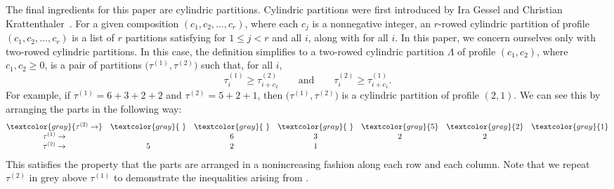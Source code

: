\documentclass[pdftex]{sigma}
\numberwithin{equation}{section}
\theoremstyle{definition}
\begin{document}
The final ingredients for this paper are cylindric partitions. Cylindric partitions were first introduced by Ira Gessel and Christian Krattenthaler~\cite{GesKra}. For a given composition $(c_1,c_2,\dots,c_r)$, where each $c_j$ is a nonnegative integer, an $r$-rowed cylindric partition of profile $(c_1,c_2,\dots,c_r)$ is a list of $r$ partitions  satisfying  for $1\le j <r$ and all $i$, along with  for all $i$. In this paper, we concern ourselves only with two-rowed cylindric partitions. In this case, the definition simplifies to a two-rowed cylindric partition $\Lambda$ of profile $(c_1,c_2)$, where $c_1,c_2\ge0$, is a pair of partitions $\bigl(\tau^{(1)},\tau^{(2)}\bigr)$ such that, for all $i$,
\begin{equation*}
\tau_i^{(1)} \ge \tau_{i+c_2}^{(2)} \qquad \text{and} \qquad \tau_i^{(2)} \ge \tau_{i+c_1}^{(1)}.
\end{equation*}
For example, if $\tau^{(1)}=6+3+2+2$ and $\tau^{(2)}=5+2+1$, then $\bigl(\tau^{(1)},\tau^{(2)}\bigr)$ is a cylindric partition of profile $(2,1)$. We can see this by arranging the parts in the following way:
\begin{equation*}
\begin{matrix}
\textcolor{gray}{\tau^{(2)} \rightarrow } & \textcolor{gray}{\text{ }}& \textcolor{gray}{\text{ }}& \textcolor{gray}{\text{ }}&\textcolor{gray}{5} & \textcolor{gray}{2} & \textcolor{gray}{1} \\
\tau^{(1)} \rightarrow & \text{ }& 6 & 3 & 2 &2 \\
\tau^{(2)} \rightarrow & 5& 2 & 1
\end{matrix}
\end{equation*}
This satisfies the property that the parts are arranged in a nonincreasing fashion along each row and each column.
Note that we repeat $\tau^{(2)}$ in grey above $\tau^{(1)}$ to demonstrate the inequalities arising from .
\end{document}
